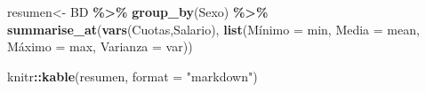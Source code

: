 \documentclass[
]{article}
\newenvironment{Shaded}{\begin{snugshade}}{\end{snugshade}}
\newcommand{\AttributeTok}[1]{\textcolor[rgb]{0.13,0.29,0.53}{#1}}
\newcommand{\FunctionTok}[1]{\textcolor[rgb]{0.13,0.29,0.53}{\textbf{#1}}}
\newcommand{\NormalTok}[1]{#1}
\newcommand{\OtherTok}[1]{\textcolor[rgb]{0.56,0.35,0.01}{#1}}
\newcommand{\SpecialCharTok}[1]{\textcolor[rgb]{0.81,0.36,0.00}{\textbf{#1}}}
\newcommand{\StringTok}[1]{\textcolor[rgb]{0.31,0.60,0.02}{#1}}
\begin{document}
\begin{Shaded}
\begin{Highlighting}[]
\NormalTok{resumen}\OtherTok{\textless{}{-}}\NormalTok{ BD }\SpecialCharTok{\%\textgreater{}\%} \FunctionTok{group\_by}\NormalTok{(Sexo) }\SpecialCharTok{\%\textgreater{}\%} \FunctionTok{summarise\_at}\NormalTok{(}\FunctionTok{vars}\NormalTok{(Cuotas,Salario), }
                                                          \FunctionTok{list}\NormalTok{(Mínimo }\OtherTok{=}\NormalTok{ min,}
                                                          \AttributeTok{Media =}\NormalTok{ mean,}
\NormalTok{                                                          Máximo }\OtherTok{=}\NormalTok{ max,}
                                                          \AttributeTok{Varianza =}\NormalTok{ var))}

\NormalTok{knitr}\SpecialCharTok{::}\FunctionTok{kable}\NormalTok{(resumen, }\AttributeTok{format =} \StringTok{"markdown"}\NormalTok{)}
\end{Highlighting}
\end{Shaded}
\end{document}
